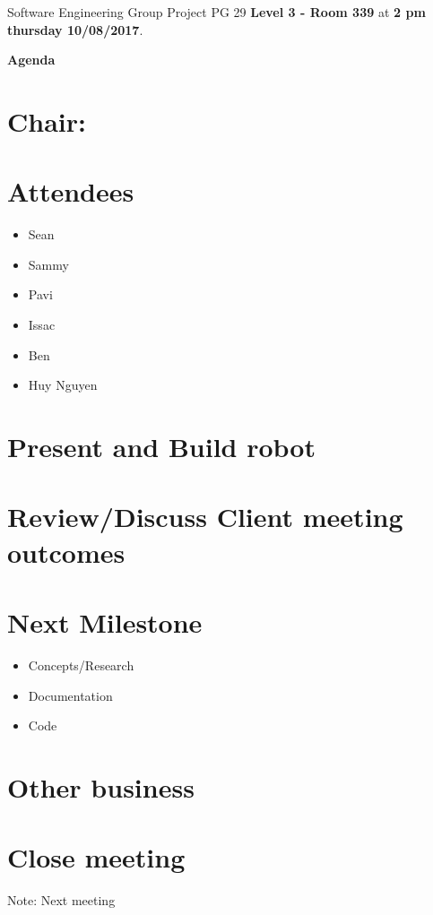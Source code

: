 \documentclass[11pt, a4paper]{article}
\begin{document}
	\noindent Software Engineering Group Project PG 29 {\bf Level 3 - Room 339} at {\bf 2 pm thursday 10/08/2017}.
	\vspace*{10pt}
	\begin{center}
		\huge \bf Agenda
	\end{center}
	
	\section*{Chair: }
	
	\vspace*{10pt}
	
	\section{Attendees}
	\begin{itemize}
		\item Sean
		\item Sammy
		\item Pavi
		\item Issac
		\item Ben
		\item Huy Nguyen
	\end{itemize}
	
	\section{Present and Build robot}
	
	\section{Review/Discuss Client meeting outcomes}
	
	\section{Next Milestone}
	\begin{itemize}
		\item Concepts/Research
		\item Documentation
		\item Code
	\end{itemize}
	
	\section{Other business}
	
	\section {Close meeting}
	\vspace*{10pt}
	\noindent Note: Next meeting 
	
\end{document}
